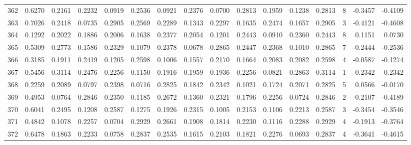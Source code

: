 \begin{tabular}{lrrrrrrrrrrrrrrr}
362 &      0.6270 &  0.2161 &  0.2232 &  0.0919 &  0.2536 &  0.0921 &  0.2376 &  0.0700 &  0.2813 &  0.1959 &   0.1238 &     0.2813 &      8 &                   -0.3457 &                    -0.4109 \\
363 &      0.7026 &  0.2418 &  0.0735 &  0.2905 &  0.2569 &  0.2289 &  0.1343 &  0.2297 &  0.1635 &  0.2474 &   0.1657 &     0.2905 &      3 &                   -0.4121 &                    -0.4608 \\
364 &      0.1292 &  0.2022 &  0.1886 &  0.2006 &  0.1638 &  0.2377 &  0.2054 &  0.1201 &  0.2443 &  0.0910 &   0.2360 &     0.2443 &      8 &                    0.1151 &                     0.0730 \\
365 &      0.5309 &  0.2773 &  0.1586 &  0.2329 &  0.1079 &  0.2378 &  0.0678 &  0.2865 &  0.2447 &  0.2368 &   0.1010 &     0.2865 &      7 &                   -0.2444 &                    -0.2536 \\
366 &      0.3185 &  0.1911 &  0.2419 &  0.1205 &  0.2598 &  0.1006 &  0.1557 &  0.2170 &  0.1664 &  0.2083 &   0.2082 &     0.2598 &      4 &                   -0.0587 &                    -0.1274 \\
367 &      0.5456 &  0.3114 &  0.2476 &  0.2256 &  0.1150 &  0.1916 &  0.1959 &  0.1936 &  0.2256 &  0.0821 &   0.2863 &     0.3114 &      1 &                   -0.2342 &                    -0.2342 \\
368 &      0.2259 &  0.2089 &  0.0797 &  0.2398 &  0.0716 &  0.2825 &  0.1842 &  0.2342 &  0.1021 &  0.1724 &   0.2071 &     0.2825 &      5 &                    0.0566 &                    -0.0170 \\
369 &      0.4953 &  0.0764 &  0.2846 &  0.2350 &  0.1185 &  0.2672 &  0.1360 &  0.2321 &  0.1796 &  0.2256 &   0.0724 &     0.2846 &      2 &                   -0.2107 &                    -0.4189 \\
370 &      0.6041 &  0.2495 &  0.1208 &  0.2587 &  0.1275 &  0.1926 &  0.2315 &  0.1005 &  0.2153 &  0.1106 &   0.2213 &     0.2587 &      3 &                   -0.3454 &                    -0.3546 \\
371 &      0.4842 &  0.1078 &  0.2257 &  0.0704 &  0.2929 &  0.2661 &  0.1908 &  0.1814 &  0.2230 &  0.1116 &   0.2288 &     0.2929 &      4 &                   -0.1913 &                    -0.3764 \\
372 &      0.6478 &  0.1863 &  0.2233 &  0.0758 &  0.2837 &  0.2535 &  0.1615 &  0.2103 &  0.1821 &  0.2276 &   0.0693 &     0.2837 &      4 &                   -0.3641 &                    -0.4615 \\

\end{tabular}
